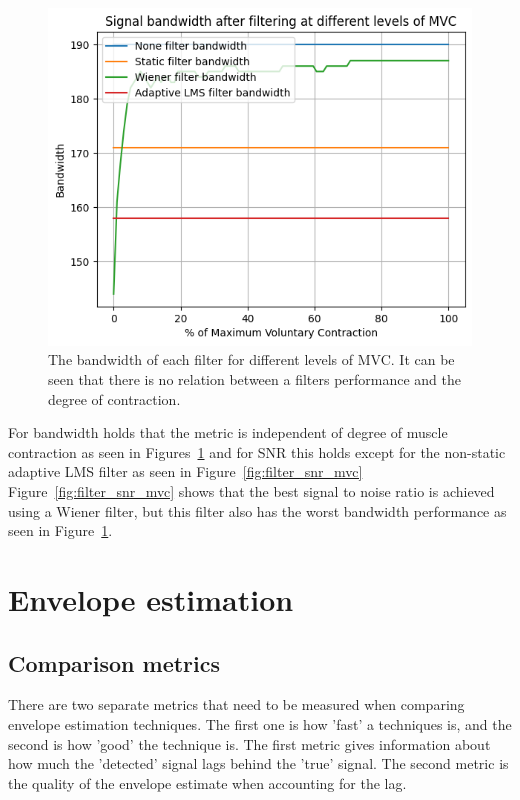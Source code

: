 \begin{figure}[h!t]
	\begin{center}
		\includegraphics[width=0.7\columnwidth]{images/filter_bw_mvc.png}
	\end{center}
	\caption{The bandwidth of each filter for different levels of MVC. It can be seen that there is no relation between a filters performance and the degree of contraction. }
	\label{fig:filter_bw_mvc}
\end{figure}

For bandwidth holds that the metric is independent of degree of muscle contraction as seen in Figures~\ref{fig:filter_bw_mvc} and for SNR this holds except for the non-static adaptive LMS filter as seen in Figure~\ref{fig:filter_snr_mvc}
Figure~\ref{fig:filter_snr_mvc} shows that the best signal to noise ratio is achieved using a Wiener filter, but this filter also has the worst bandwidth performance as seen in Figure~\ref{fig:filter_bw_mvc}. 

\section{Envelope estimation}
\subsection{Comparison metrics}
There are two separate metrics that need to be measured when comparing envelope estimation techniques. The first one is how 'fast' a techniques is, and the second is how 'good' the technique is. The first metric gives information about how much the 'detected' signal lags behind the 'true' signal. The second metric is the quality of the envelope estimate when accounting for the lag.

